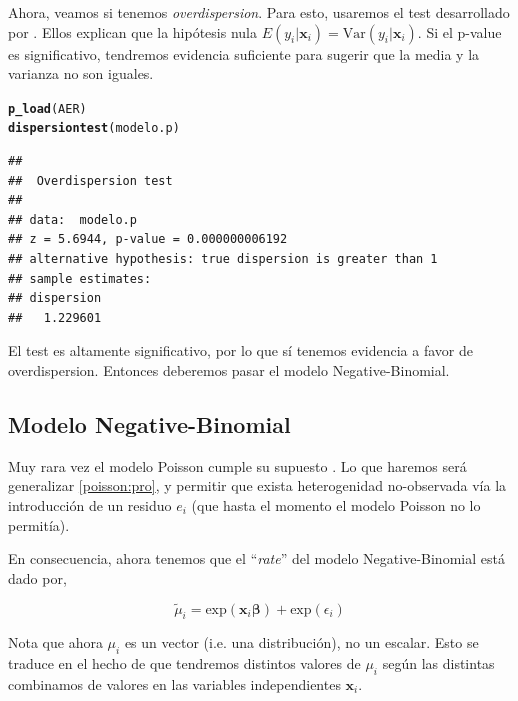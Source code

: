 \documentclass[onesided]{article}\usepackage[]{graphicx}\usepackage[]{color}
\makeatletter
\newcommand{\hlstd}[1]{\textcolor[rgb]{0.345,0.345,0.345}{#1}}%
\newcommand{\hlkwd}[1]{\textcolor[rgb]{0.737,0.353,0.396}{\textbf{#1}}}%
\newenvironment{kframe}{%
 \def\at@end@of@kframe{}%
 \ifinner\ifhmode%
  \def\at@end@of@kframe{\end{minipage}}%
  \begin{minipage}{\columnwidth}%
 \fi\fi%
 \def\FrameCommand##1{\hskip\@totalleftmargin \hskip-\fboxsep
 \colorbox{shadecolor}{##1}\hskip-\fboxsep
     \hskip-\linewidth \hskip-\@totalleftmargin \hskip\columnwidth}%
 \MakeFramed {\advance\hsize-\width
   \@totalleftmargin\z@ \linewidth\hsize
   \@setminipage}}%
 {\par\unskip\endMakeFramed%
 \at@end@of@kframe}
\newenvironment{knitrout}{}{} %
\makeatother
\begin{document}
Ahora, veamos si tenemos \emph{overdispersion}. Para esto, usaremos el test desarrollado por \textcite{Cameron1990a}. Ellos explican que la hip\'otesis nula $E(y_{i}|\boldsymbol{x}_{i}) = \text{Var}(y_{i}|\boldsymbol{x}_{i})$. Si el p-value es significativo, tendremos evidencia suficiente para sugerir que la media y la varianza no son iguales.


\begin{knitrout}
\color{fgcolor}\begin{kframe}
\begin{alltt}
\hlkwd{p_load}\hlstd{(AER)}
\hlkwd{dispersiontest}\hlstd{(modelo.p)}
\end{alltt}
\begin{verbatim}
## 
## 	Overdispersion test
## 
## data:  modelo.p
## z = 5.6944, p-value = 0.000000006192
## alternative hypothesis: true dispersion is greater than 1
## sample estimates:
## dispersion 
##   1.229601
\end{verbatim}
\end{kframe}
\end{knitrout}

El test es altamente significativo, por lo que s\'i tenemos evidencia a favor de overdispersion. Entonces deberemos pasar el modelo Negative-Binomial.


\subsection{Modelo Negative-Binomial}

Muy rara vez el modelo Poisson cumple su supuesto \parencite[230]{Long:1997wv}. Lo que haremos ser\'a generalizar \autoref{poisson:pro}, y permitir que exista heterogenidad no-observada v\'ia la introducci\'on de un residuo $e_{i}$ (que hasta el momento el modelo Poisson no lo permit\'ia).

En consecuencia, ahora tenemos que el ``\emph{rate}'' del modelo Negative-Binomial est\'a dado por,


\begin{equation}\label{nb:mu}
\tilde{\mu}_{i} = \text{exp}(\boldsymbol{x}_{i}\boldsymbol{\beta}) + \text{exp}(\epsilon_{i})
\end{equation}

Nota que ahora $\mu_{i}$ es un vector (i.e. una distribuci\'on), no un escalar. Esto se traduce en el hecho de que tendremos distintos valores de $\mu_{i}$ seg\'un las distintas combinamos de valores en las variables independientes $\boldsymbol{x}_{i}$. 
\end{document}
